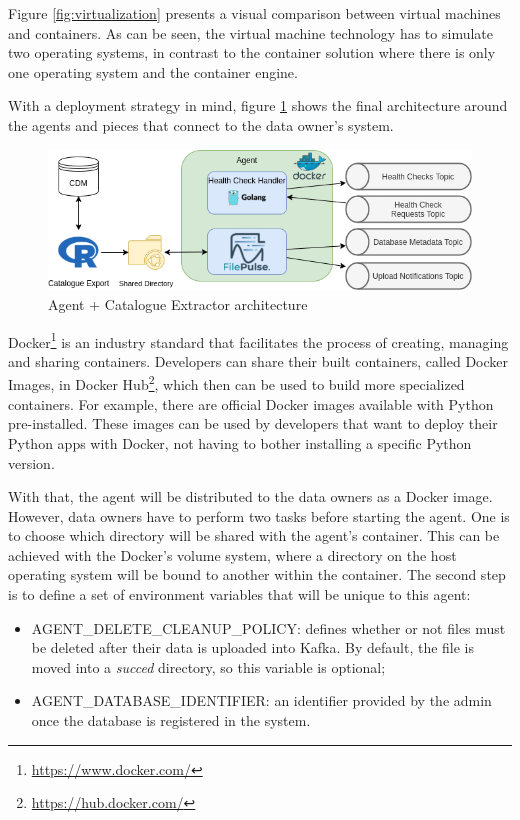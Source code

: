 Figure \ref{fig:virtualization} presents a visual comparison between virtual machines and containers.
As can be seen, the virtual machine technology has to simulate two operating systems, in contrast to the container solution where there is only one operating system and the container engine.

With a deployment strategy in mind, figure \ref{fig:agent-architecture} shows the final architecture around the agents and pieces that connect to the data owner's system.

\begin{figure}[H]
    \center
    \includegraphics[width=\textwidth]{agent-architecture}
    \caption{Agent + Catalogue Extractor architecture}
    \label{fig:agent-architecture}
\end{figure}

Docker\footnote{\url{https://www.docker.com/}} is an industry standard that facilitates the process of creating, managing and sharing containers.
Developers can share their built containers, called Docker Images, in Docker Hub\footnote{\url{https://hub.docker.com/}}, which then can be used to build more specialized containers.
For example, there are official Docker images available with Python pre-installed. These images can be used by developers that want to deploy their Python apps with Docker, not having to bother installing a specific Python version.

With that, the agent will be distributed to the data owners as a Docker image.
However, data owners have to perform two tasks before starting the agent.
One is to choose which directory will be shared with the agent's container.
This can be achieved with the Docker's volume system, where a directory on the host operating system will be bound to another within the container.
The second step is to define a set of environment variables that will be unique to this agent:

\begin{itemize}
    \item AGENT\_DELETE\_CLEANUP\_POLICY: defines whether or not files must be deleted after their data is uploaded into Kafka.
        By default, the file is moved into a \textit{succed} directory, so this variable is optional;
    \item AGENT\_DATABASE\_IDENTIFIER: an identifier provided by the admin once the database is registered in the system.
\end{itemize}

